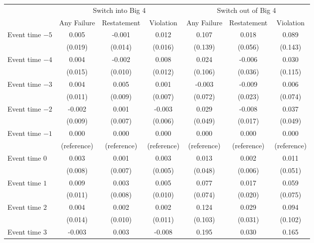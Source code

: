 \documentclass[10pt]{article}
\newcommand{\sym}[1]{\textsuperscript{#1}}
\begin{document}
\begin{minipage}{19cm}\fontsize{10}{12}\selectfont\setlength{\tabcolsep}{4pt}\renewcommand{\arraystretch}{1.15}


\def\sym#1{\ifmmode^{#1}\else\(^{#1}\)\fi}
\centering
{}
\label{tab:big4-eventstudy-sa}
\begin{threeparttable}

\begin{tabular}{l c c c c c c }
\toprule
 & \multicolumn{3}{c}{Switch into Big 4} & \multicolumn{3}{c}{Switch out of Big 4} \\
\cmidrule(lr){2-4}\cmidrule(lr){5-7}
 & Any Failure & Restatement & Violation & Any Failure & Restatement & Violation \\
\midrule
Event time $-5$ & 0.005 & -0.001 & 0.012 & 0.107 & 0.018 & 0.089 \\
 & (0.019) & (0.014) & (0.016) & (0.139) & (0.056) & (0.143) \\
Event time $-4$ & 0.004 & -0.002 & 0.008 & 0.024 & -0.006 & 0.030 \\
 & (0.015) & (0.010) & (0.012) & (0.106) & (0.036) & (0.115) \\
Event time $-3$ & 0.004 & 0.005 & 0.001 & -0.003 & -0.009 & 0.006 \\
 & (0.011) & (0.009) & (0.007) & (0.072) & (0.023) & (0.074) \\
Event time $-2$ & -0.002 & 0.001 & -0.003 & 0.029 & -0.008 & 0.037 \\
 & (0.009) & (0.007) & (0.006) & (0.049) & (0.017) & (0.049) \\
Event time $-1$ & 0.000 & 0.000 & 0.000 & 0.000 & 0.000 & 0.000 \\
 & (reference) & (reference) & (reference) & (reference) & (reference) & (reference) \\
Event time $0$ & 0.003 & 0.001 & 0.003 & 0.013 & 0.002 & 0.011 \\
 & (0.008) & (0.007) & (0.005) & (0.048) & (0.006) & (0.051) \\
Event time $1$ & 0.009 & 0.003 & 0.005 & 0.077 & 0.017 & 0.059 \\
 & (0.011) & (0.008) & (0.010) & (0.074) & (0.020) & (0.075) \\
Event time $2$ & 0.004 & 0.002 & 0.002 & 0.124 & 0.029 & 0.094 \\
 & (0.014) & (0.010) & (0.011) & (0.103) & (0.031) & (0.102) \\
Event time $3$ & -0.003 & 0.003 & -0.008 & 0.195 & 0.030 & 0.165 \\

\end{tabular}
\end{threeparttable}
\end{minipage}
\end{document}
